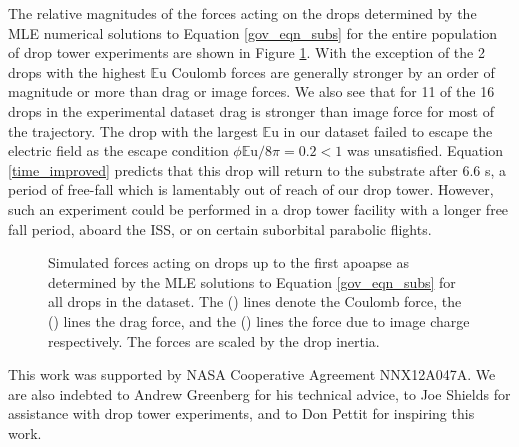 \documentclass[aip,reprint, floatfix]{revtex4-1}
\begin{document}
The relative magnitudes of the forces acting on the drops determined by the MLE numerical solutions to Equation \ref{gov_eqn_subs} for the entire population of drop tower experiments are shown in Figure \ref{fig:forces}. With the exception of the 2 drops with the highest $\mathbb{E}\mbox{u}$ Coulomb forces are generally stronger by an order of magnitude or more than drag or image forces. We also see that for 11 of the 16 drops in the experimental dataset drag is stronger than image force for most of the trajectory. The drop with the largest $\mathbb{E}\mbox{u}$ in our dataset failed to escape the electric field as the escape condition $\phi \mathbb{E}\mbox{u} / 8\pi = 0.2 < 1$ was unsatisfied. Equation \ref{time_improved} predicts that this drop will return to the substrate after 6.6 s, a period of free-fall which is lamentably out of reach of our drop tower. However, such an experiment could be performed in a drop tower facility with a longer free fall period, aboard the ISS, or on certain suborbital parabolic flights.
\begin{figure}[!htb]
    \centering
    \resizebox{0.5\textwidth}{!}{}
    \caption{Simulated forces acting on drops up to the first apoapse as determined by the MLE solutions to Equation \ref{gov_eqn_subs} for all drops in the dataset. The (\protect\redline) lines denote the Coulomb force, the (\protect\blueline) lines the drag force, and the (\protect\cyanline) lines the force due to image charge respectively. The forces are scaled by the drop inertia.\label{fig:forces}}
\end{figure}

\begin{acknowledgments}
This work was supported by NASA Cooperative Agreement NNX12A047A. We are also indebted to Andrew Greenberg for his technical advice, to Joe Shields for assistance with drop tower experiments, and to Don Pettit for inspiring this work.
\end{acknowledgments}


%
%
\end{document}
